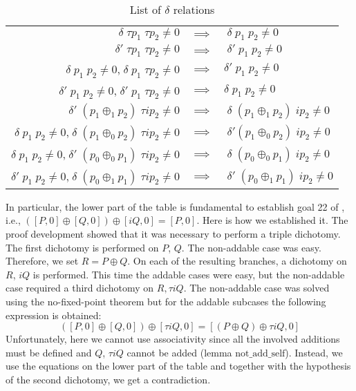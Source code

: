 \documentclass[runningheads]{llncs}
\begin{document}
\begin{table}
\begin{center}
	\begin{tabular}{ r c l }
		$\delta \; \tau p_1 \; \tau p_2 \neq 0$ & $\implies$ & $\; \delta \; p_1 \; p_2 \neq 0$ \\ 
		$\delta' \; \tau p_1 \; \tau p_2 \neq 0$ & $\implies$ & $\; \delta' \; p_1 \; p_2 \neq 0$ \\ 
		$\delta \; p_1 \; p_2 \neq 0$,$\; \delta \; p_1 \; \tau p_2 \neq 0$ & $\implies$ & $\delta' \; p_1 \; p_2 \neq 0$ \\ 
		$\delta' \; p_1 \; p_2 \neq 0$,$\; \delta' \; p_1 \; \tau p_2 \neq 0$ & $\implies$ & $\delta \; p_1 \;p_2 \neq 0$ \\ 
		\hline
	    $\delta' \; (p_1 \oplus_1 p_2) \; \tau i p_2 \neq 0$ & $\implies$ & $\; \delta \; (p_1 \oplus_1 p_2) \; i p_2 \neq 0$ \\ 
	    $\delta \; p_1 \; p_2 \neq 0$,$\; \delta \; (p_1 \oplus_0 p_2) \; \tau i p_2 \neq 0$ & $\implies$ & $\; \delta' (p_1 \oplus_0 p_2) \; i p_2 \neq 0$ \\ 
	    $\delta \; p_1 \; p_2 \neq 0$,$\; \delta' \; (p_0 \oplus_0 p_1) \; \tau i p_2 \neq 0$ & $\implies$ & $\; \delta \; (p_0 \oplus_0 p_1) \; i p_2 \neq 0$ \\ 
	    
	    $\delta' \; p_1 \; p_2 \neq 0$,$\; \delta \; (p_0 \oplus_1 p_1) \; \tau i p_2 \neq 0$ & $\implies$ & $\; \delta' \; (p_0 \oplus_1 p_1) \; i p_2 \neq 0$ \\
	\end{tabular}
\end{center}
	\caption{List of $\delta$ relations}
	\label{table:1}
\end{table}
In particular, the lower part of the table is fundamental to establish goal 22 of \cite{hales2016group}, i.e., $([P,0] \oplus [Q,0]) \oplus [iQ,0] = [P,0]$. Here is how we established it. The proof development showed that it was necessary to perform a triple dichotomy. The first dichotomy is performed on $P$, $Q$. The non-addable case was easy. Therefore, we set $R = P \oplus Q$. On each of the resulting branches, a dichotomy on $R$, $iQ$ is performed. This time the addable cases were easy, but the non-addable case required a third dichotomy on $R,\tau i Q$. The non-addable case was solved using the no-fixed-point theorem but for the addable subcases the following expression is obtained: $$([P,0] \oplus [Q,0]) \oplus [\tau i Q,0] = [(P \oplus Q) \oplus \tau i Q,0]$$ Unfortunately, here we cannot use associativity since all the involved additions must be defined and $Q$, $\tau i Q$ cannot be added (lemma $\text{not\_add\_self}$). Instead, we use the equations on the lower part of the table and together with the hypothesis of the second dichotomy, we get a contradiction. 
\end{document}
